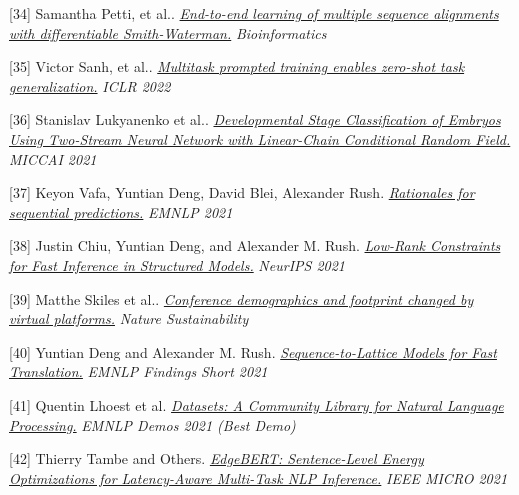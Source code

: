 \documentclass[10pt]{article}
\begin{document}
\medskip


[34] \ind Samantha Petti, et al.. \emph{\href{ http://repository.cshl.edu/id/eprint/40409/1/2021.Petti.multiple_sequence_alignments.pdf }{ End-to-end learning of multiple sequence alignments with differentiable Smith-Waterman.} }\emph{ Bioinformatics }

\medskip


[35] \ind Victor Sanh, et al.. \emph{\href{ https://arxiv.org/pdf/2110.08207 }{ Multitask prompted training enables zero-shot task generalization.} }\emph{ ICLR 2022 }

\medskip


[36] \ind Stanislav Lukyanenko et al.. \emph{\href{ https://www.ncbi.nlm.nih.gov/pmc/articles/PMC8526069/ }{ Developmental Stage Classification of Embryos Using Two-Stream Neural Network with Linear-Chain Conditional Random Field.} }\emph{ MICCAI 2021 }

\medskip


[37] \ind Keyon Vafa, Yuntian Deng, David Blei, Alexander Rush. \emph{\href{ https://arxiv.org/pdf/2109.06387 }{ Rationales for sequential predictions.} }\emph{ EMNLP 2021 }

\medskip


[38] \ind Justin Chiu, Yuntian Deng, and Alexander M. Rush. \emph{\href{ https://proceedings.neurips.cc/paper/2021/file/16c0d78ef6a76b5c247113a4c9514059-Paper.pdf }{ Low-Rank Constraints for Fast Inference in Structured Models.} }\emph{ NeurIPS 2021 }

\medskip


[39] \ind Matthe Skiles et al.. \emph{\href{ https://www.nature.com/articles/s41893-021-00823-2 }{ Conference demographics and footprint changed by virtual platforms.} }\emph{ Nature Sustainability }

\medskip


[40] \ind Yuntian Deng and Alexander M. Rush. \emph{\href{ https://aclanthology.org/2021.findings-emnlp.318.pdf }{ Sequence-to-Lattice Models for Fast Translation.} }\emph{ EMNLP Findings Short 2021 }

\medskip


[41] \ind Quentin Lhoest et al. \emph{\href{ https://arxiv.org/pdf/2109.02846.pdf }{ Datasets: A Community Library for Natural Language Processing.} }\emph{ EMNLP Demos 2021 (Best Demo) }

\medskip


[42] \ind Thierry Tambe and Others. \emph{\href{ https://arxiv.org/pdf/2011.14203.pdf }{ EdgeBERT: Sentence-Level Energy Optimizations for Latency-Aware Multi-Task NLP Inference.} }\emph{ IEEE MICRO 2021 }
\end{document}
